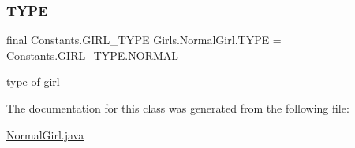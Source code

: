 \subsubsection{\texorpdfstring{T\+Y\+PE}{TYPE}}
{\footnotesize\ttfamily final Constants.\+G\+I\+R\+L\+\_\+\+T\+Y\+PE Girls.\+Normal\+Girl.\+T\+Y\+PE = Constants.\+G\+I\+R\+L\+\_\+\+T\+Y\+P\+E.\+N\+O\+R\+M\+AL}

type of girl 

The documentation for this class was generated from the following file\+:\begin{DoxyCompactItemize}
\item 
\hyperlink{_normal_girl_8java}{Normal\+Girl.\+java}\end{DoxyCompactItemize}
